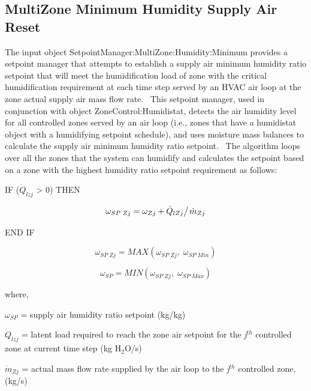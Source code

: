 \subsection{MultiZone Minimum Humidity Supply Air Reset}\label{multizone-minimum-humidity-supply-air-reset}

The input object SetpointManager:MultiZone:Humidity:Minimum provides a setpoint manager that attempts to establish a supply air minimum humidity ratio setpoint that will meet the humidification load of zone with the critical humidification requirement at each time step served by an HVAC air loop at the zone actual supply air mass flow rate.~ This setpoint manager, used in conjunction with object ZoneControl:Humidistat, detects the air humidity level for all controlled zones served by an air loop (i.e., zones that have a humidistat object with a humidifying setpoint schedule), and uses moisture mass balances to calculate the supply air minimum humidity ratio setpoint.~ The algorithm loops over all the zones that the system can humidify and calculates the setpoint based on a zone with the highest humidity ratio setpoint requirement as follows:

IF (\({\dot Q_{lzj}}\) \textgreater{} 0) THEN

\begin{equation}
{\omega_{SP\;Zj}} = {\omega_{Zj}} + {{{{\dot Q}_{lZj}}} \mathord{\left/ {\vphantom {{{{\dot Q}_{lZj}}} {{{\dot m}_{Zj}}}}} \right. } {{{\dot m}_{Zj}}}}
\end{equation}

END IF

\begin{equation}
{\omega_{SP\;Zj}} = MAX\left( {{\omega_{SP\;Zj}},\;{\omega_{SP\;Min}}} \right)
\end{equation}

\begin{equation}
{\omega_{SP}} = MIN\left( {{\omega_{SP\;Zj}},\;{\omega_{SP\;Max}}} \right)
\end{equation}

where,

\({\omega_{SP}}\) = supply air humidity ratio setpoint (kg/kg)

\({\dot Q_{lzj}}\) = latent load required to reach the zone air setpoint for the \emph{j}\(^{th}\) controlled zone at current time step (kg H\(_{2}\)O/s)

\({\dot m_{Zj}}\) = actual mass flow rate supplied by the air loop to the \emph{j}\(^{th}\) controlled zone, (kg/s)

